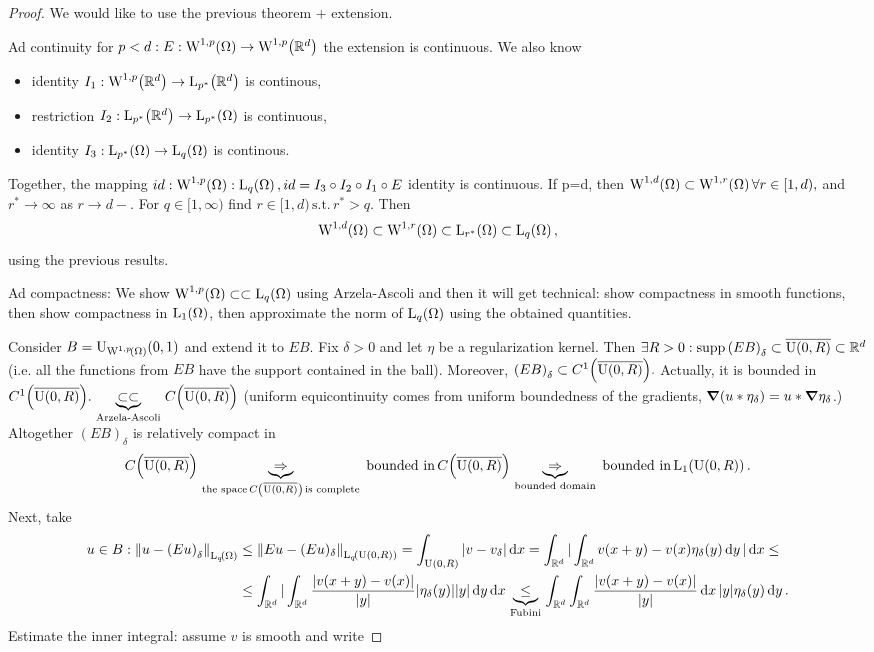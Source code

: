 \documentclass{article}
\begin{document}
	\begin{proof}
	We would like to use the previous theorem + extension. 

	Ad continuity for $p<d: E:\WkpSet[1][p]{\Omega} \to \WkpSet[1][p]{\R^d}$ the extension is continuous. We also know
	\begin{itemize}
		\item identity $I_1:\WkpSet[1][p]{\R^d}\to \LpSet[p^{*}]{\R^d}$ is continous, 
		\item restriction $I_2: \LpSet[p^{*}]{\R^d}\to \LpSet[p^{*}]{\Omega}$ is continuous, 
		\item identity $I_3: \LpSet[p^{*}]{\Omega} \to \LpSet[q]{\Omega}$ is continous.
	\end{itemize}
	Together, the mapping $id:\WkpSet[1][p]{\Omega}: \LpSet[q]{\Omega}, id=I_3 \circ I_2 \circ I_1 \circ E$ identity is continuous. If p=d, then $\WkpSet[1][d]{\Omega} \subset \WkpSet[1][r]{\Omega} \forall r \in [1,d),$ and $r^{*} \to \infty$ as $r\to d-.$ For $q \in [1,\infty)$ find $r \in [1,d) \, \text{s.t.} \, r^{*} >q.$ Then
	\[
		\WkpSet[1][d]{\Omega} \subset \WkpSet[1][r]{\Omega} \subset \LpSet[r^{*}]{\Omega} \subset \LpSet[q]{\Omega},
	\]
	using the previous results.

	Ad compactness: We show $\WkpSet[1][p]{\Omega} \subset \subset \LpSet[q]{\Omega}$ using Arzela-Ascoli and then it will get technical: show compactness in smooth functions, then show compactness in $\LpSet[1]{\Omega}$, then approximate the norm of $\LpSet[q]{\Omega}$ using the obtained quantities.

	Consider $B=\text{U}_{\WkpSet[1][p]{\Omega}}(0,1)$ and extend it to $EB$. Fix $\delta>0$ and let $\eta$ be a regularization kernel. Then $\exists R>0: \operatorname{supp} \qty(EB)_{\delta} \subset \overline{\text{U}(0,R)} \subset {\mathbb R}^d$ (i.e. all the functions from $EB$ have the support contained in the ball). Moreover, $\qty(EB)_{\delta} \subset C^1\qty(\overline{\text{U}(0,R)}).$ Actually, it is bounded in $C^1\qty(\overline{\text{U}(0,R)}). \underbrace{\subset \subset}_{\, \text{Arzela-Ascoli} \,} C\qty(\overline{\text{U}(0,R)})$ (uniform equicontinuity comes from uniform boundedness of the gradients, $\grad\qty(u * \eta_{\delta}) = u * \grad \eta_{\delta}$.)
	Altogether $(EB)_{\delta}$ is relatively compact in
	\[
		C\qty(\overline{\text{U}(0,R)}) \underbrace{\Rightarrow}_{\, \text{the space} \, C\qty(\overline{\text{U}(0,R)}) \, \text{is complete} \,}\, \text{bounded in} \,C\qty(\overline{\text{U}(0,R)}) \underbrace{\Rightarrow}_{\, \text{bounded domain} \,} \, \text{bounded in} \, \LpSet[1]{\text{U}(0,R)}.
	\]
	Next, take
	\begin{align*}
		u \in B: \norm{u-\qty(Eu)_{\delta}}_{\LpSet[q]{\Omega}} &\leq \norm{Eu-(Eu)_{\delta}}_{\LpSet[q]{\text{U}(0,R)}} = \int_{\text{U}(0,R)}|v-v_{\delta}|\dd{x} = \int_{\R^d}|\int_{\R^d}v\qty(x+y)-v(x) \eta_{\delta}(y)\dd{y}|\dd{x}\leq \\
									&\leq \int_{\R^d}|\int_{\R^d}\frac{|v(x+y)-v(x)|}{|y|}|\eta_{\delta}(y)| |y| \dd{y}\dd{x} \underbrace{\leq}_{\, \text{Fubini} \,} \int_{\R^d}\int_{\R^d}\frac{|v(x+y)-v(x)|}{|y|}\dd{x}|y| \eta_{\delta}(y)\dd{y}.
	\end{align*}
	Estimate the inner integral: assume $v$ is smooth and write


\end{proof}
\end{document}
